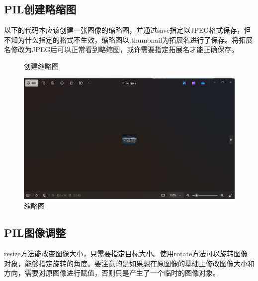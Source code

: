 \documentclass[fontset=ubuntu]{ctexart}
\begin{document}
\subsection{PIL创建略缩图}
以下的代码本应该创建一张图像的缩略图，并通过save指定以JPEG格式保存，但不知为什么指定的格式不生效，缩略图以.thumbnail为拓展名进行了保存。将拓展名修改为JPEG后可以正常看到略缩图，或许需要指定拓展名才能正确保存。
\begin{figure}[htb]
    \centering
    \caption{创建缩略图}
    \label{thmubnails}
\end{figure}

\begin{figure}[htb]
    \centering
    \includegraphics[width=0.5\linewidth]{thumbnails_3.png}
    \caption{缩略图}
    \label{fig:thumbnails_3}
\end{figure}

\subsection{PIL图像调整}
resize方法能改变图像大小，只需要指定目标大小。使用rotate方法可以旋转图像对象，能够指定旋转的角度。要注意的是如果想在原图像的基础上修改图像大小和方向，需要对原图像进行赋值，否则只是产生了一个临时的图像对象。
\end{document}
